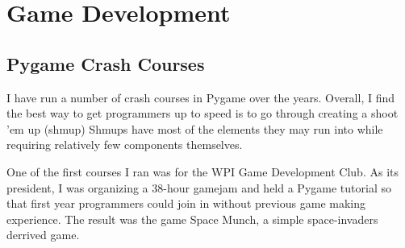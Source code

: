 \chapter{Game Development}


\section{Pygame Crash Courses}

I have run a number of crash courses in Pygame over the years.  
Overall, I find the best way to get programmers up to speed is to go through creating a shoot 'em up (shmup)
Shmups have most of the elements they may run into while requiring relatively few components themselves.

One of the first courses I ran was for the WPI Game Development Club.  
As its president, I was organizing a 38-hour gamejam and held a Pygame tutorial so that first year programmers could join in without previous game making experience.
The result was the game Space Munch, a simple space-invaders derrived game.

